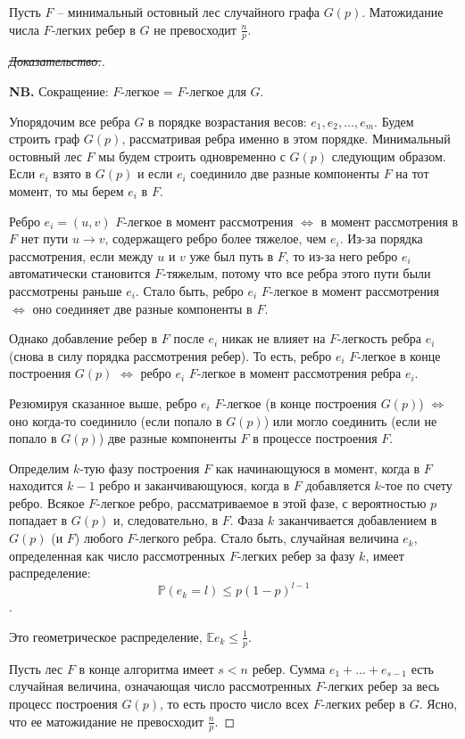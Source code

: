 \begin{theorem*}
    Пусть $F$ -- минимальный остовный лес случайного графа $G(p)$. Матожидание числа $F$-легких ребер в $G$ не превосходит $\frac{n}{p}$.
\end{theorem*}
\begin{proof}[\sout{Доказательство.}]
    $ $

    \textbf{NB. } Сокращение: $F$-легкое = $F$-легкое для $G$.

    Упорядочим все ребра $G$ в порядке возрастания весов: $e_1, e_2, \ldots, e_m$. Будем строить граф $G(p)$, рассматривая ребра именно в этом порядке. Минимальный остовный лес $F$ мы будем строить одновременно с $G(p)$ следующим образом. Если $e_i$ взято в $G(p)$ и если $e_i$ соединило две разные компоненты $F$ на тот момент, то мы берем $e_i$ в $F$.

    Ребро $e_i = (u,v)$ $F$-легкое в момент рассмотрения $\iff$ в момент рассмотрения в $F$ нет пути $u \rightarrow v$, содержащего ребро более тяжелое, чем $e_i$. Из-за порядка рассмотрения, если между $u$ и $v$ уже был путь в $F$, то из-за него ребро $e_i$ автоматически становится $F$-тяжелым, потому что все ребра этого пути были рассмотрены раньше $e_i$. Стало быть, ребро $e_i$ $F$-легкое в момент рассмотрения $\iff$ оно соединяет две разные компоненты в $F$.

    Однако добавление ребер в $F$ после $e_i$ никак не влияет на $F$-легкость ребра $e_i$ (снова в силу порядка рассмотрения ребер). То есть, ребро $e_i$ $F$-легкое в конце построения $G(p)$ $\iff$ ребро $e_i$ $F$-легкое в момент рассмотрения ребра $e_i$.

    Резюмируя сказанное выше, ребро $e_i$ $F$-легкое (в конце построения $G(p)$) $\iff$ оно когда-то соединило (если попало в $G(p)$) или могло соединить (если не попало в $G(p)$) две разные компоненты $F$ в процессе построения $F$.

    Определим $k$-тую фазу построения $F$ как начинающуюся в момент, когда в $F$ находится $k-1$ ребро и заканчивающуюся, когда в $F$ добавляется $k$-тое по счету ребро. Всякое $F$-легкое ребро, рассматриваемое в этой фазе, с вероятностью $p$ попадает в $G(p)$ и, следовательно, в $F$. Фаза $k$ заканчивается добавлением в $G(p)$ (и $F$) любого $F$-легкого ребра. Стало быть, случайная величина $e_k$, определенная как число рассмотренных $F$-легких ребер за фазу $k$, имеет распределение: $$\mathbb P(e_k = l) \leq  p(1-p)^{l-1}$$.

    Это геометрическое распределение, $\mathbb E e_k \leq \frac{1}{p}$.

    Пусть лес $F$ в конце алгоритма имеет $s < n$ ребер. Сумма $e_1 + ... + e_{s-1}$ есть случайная величина, означающая число рассмотренных $F$-легких ребер за весь процесс построения $G(p)$, то есть просто число всех $F$-легких ребер в $G$. Ясно, что ее матожидание не превосходит $\frac{n}{p}$.

\end{proof}

